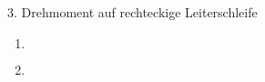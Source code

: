 \documentclass{alex_hü}
\begin{document}
\begin{mybox}{3. Drehmoment auf rechteckige Leiterschleife}
	\centering \( \)
	\tcblower
	\begin{enumerate}
		\item \(  \)
%				
	\tcbline
		\item 
	\end{enumerate}
\end{mybox}
\end{document}
